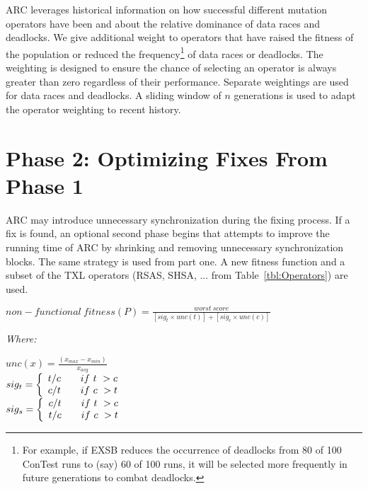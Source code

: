 \documentclass{llncs}
\begin{document}
ARC leverages historical information on how successful different mutation operators have been and about the relative dominance of data races and deadlocks. We give additional weight to operators that have raised the fitness of the population or reduced the frequency\footnote{For example, if EXSB reduces the occurrence of deadlocks from 80 of 100 ConTest runs to (say) 60 of 100 runs, it will be selected more frequently in future generations to combat deadlocks.} of data races or deadlocks.   The weighting is designed to ensure the chance of selecting an operator is always greater than zero regardless of their performance. Separate weightings are used for data races and deadlocks. A sliding window of $n$ generations is used to adapt the operator weighting to recent history. 

\section{Phase 2: Optimizing Fixes From Phase 1}
\label{sec:Phase2Nonfunctional}

ARC may introduce unnecessary synchronization during the fixing process. If a fix is found, an optional second phase begins that attempts to improve the running time of ARC by shrinking and removing unnecessary synchronization blocks.  The same strategy is used from part one.  A new fitness function and a subset of the TXL operators (RSAS, SHSA, ... from Table~\ref{tbl:Operators}) are used. 

\begin{footnotesize}
\begin{center}
$non-functional\ fitness(P) = \frac{worst\ score}{[sig_t \times unc(t)] + [sig_c \times unc(c)]}$
\end{center}
\vspace{0.1cm} \textit{Where:} \vspace{0.1cm}
\end{footnotesize}
\begin{scriptsize}
\begin{center}
$unc(x) = \frac{(x_{max} - x_{min})}{x_{avg}}$ \\ \vspace{0.2cm}
$
 sig_t = \left\{
 \begin{array}{l l}
   t/c & \quad if\ t\ > c \\
   c/t & \quad if\ c\ > t \\
 \end{array} \right.
$ \\ \vspace{0.2cm}
$
 sig_s = \left\{
 \begin{array}{l l}
   c/t & \quad if\ t\ > c \\
   t/c & \quad if\ c\ > t \\
 \end{array} \right.
$ \\
\end{center}
\end{scriptsize}
\end{document}
